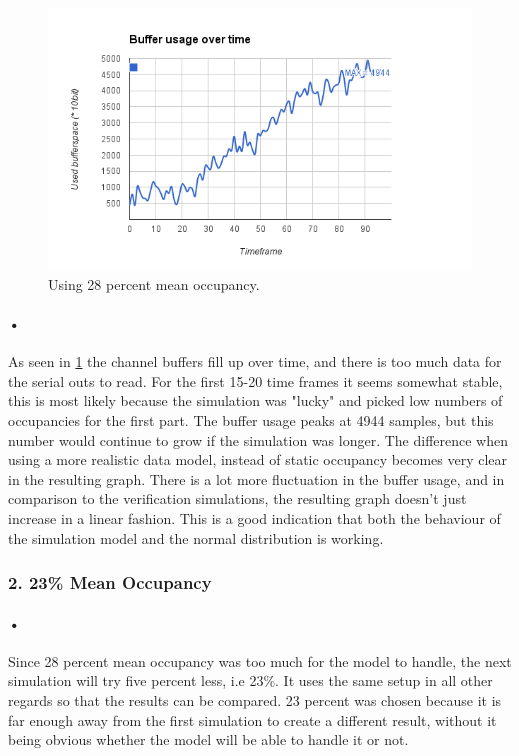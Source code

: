 \documentclass[a4paper, 12pt]{report}\dfrac{\right }{•}
\begin{document}
\begin{figure}[h!]
	\centering
		\includegraphics[width=1.0\textwidth]{images/mean-28.png}
		\caption{Using 28 percent mean occupancy.}
		\label{fig:28-occ}
\end{figure}

\paragraph{•}
As seen in \ref{fig:28-occ} the channel buffers fill up over time, and there is too much data for the serial outs to read.
For the first 15-20 time frames it seems somewhat stable, this is most likely because the simulation was "lucky" and picked low numbers of occupancies for the first part.
The buffer usage peaks at 4944 samples, but this number would continue to grow if the simulation was longer.
The difference when using a more realistic data model, instead of static occupancy becomes very clear in the resulting graph.
There is a lot more fluctuation in the buffer usage, and in comparison to the verification simulations, the resulting graph doesn't just increase in a linear fashion.
This is a good indication that both the behaviour of the simulation model and the normal distribution is working.


\subsubsection{2. 23\% Mean Occupancy}

\paragraph{•}
Since 28 percent mean occupancy was too much for the model to handle, the next simulation will try five percent less, i.e 23\%.
It uses the same setup in all other regards so that the results can be compared.
23 percent was chosen because it is far enough away from the first simulation to create a different result, without it being obvious whether the model will be able to handle it or not.
\end{document}
